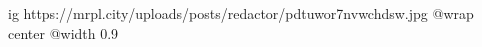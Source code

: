  
 
 
 
 

\ifcmt
  ig https://mrpl.city/uploads/posts/redactor/pdtuwor7nvwchdsw.jpg
  @wrap center
  @width 0.9
\fi
